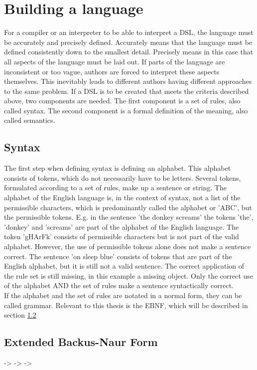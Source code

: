 \section{Building a language}
For a compiler or an interpreter to be able to interpret a \ac{DSL}, the language must be accurately and precisely defined. Accurately means that the language must be defined consistently down to the smallest detail. Precisely means in this case that all aspects of the language must be laid out. If parts of the language are inconsistent or too vague, authors are forced to interpret these aspects themselves. This inevitably leads to different authors having different approaches to the same problem. If a \ac{DSL} is to be created that meets the criteria described above, two components are needed. The first component is a set of rules, also called syntax. The second component is a formal definition of the meaning, also called semantics. \parencite[cf.][p. 2]{farrell_compiler_1995}
\subsection{Syntax}
The first step when defining syntax is defining an alphabet. This alphabet consists of tokens, which do not necessarily have to be letters. Several tokens, formulated according to a set of rules, make up a sentence or string. The alphabet of the English language is, in the context of syntax, not a list of the permissible characters, which is predominantly called the alphabet or 'ABC', but the permissible tokens.
E.g. in the sentence 'the donkey screams' the tokens 'the', 'donkey' and 'screams' are part of the alphabet of the English language. The token 'gHArFk' consists of permissible characters but is not part of the valid alphabet. However, the use of permissible tokens alone does not make a sentence correct. The sentence 'on sleep blue' consists of tokens that are part of the English alphabet, but it is still not a valid sentence. The correct application of the rule set is still missing, in this example a missing object. Only the correct use of the alphabet AND the set of rules make a sentence syntactically correct. \parencite[cf.][p. 2]{farrell_compiler_1995}\\
If the alphabet and the set of rules are notated in a normal form, they can be called grammar. Relevant to this thesis is the \ac{EBNF}, which will be described in section \ref{sec:EBNF}
\subsection{Extended Backus-Naur Form}\label{sec:EBNF}
\parencite{backus_report_1960} -> \parencite{wirth_what_1977} -> \parencite{isoiec_149771996e_information_1996} -> \parencite{zaytsev_bnf_2012}
